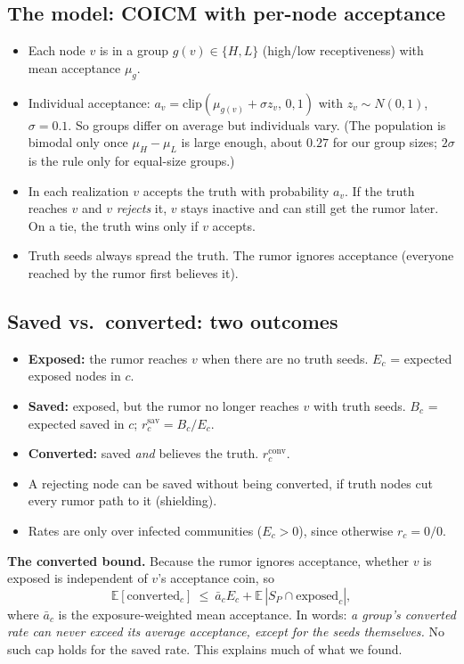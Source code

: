 \documentclass[11pt]{article}
\begin{document}
\subsection{The model: COICM with per-node acceptance}
\begin{itemize}
\item Each node $v$ is in a group $g(v)\in\{H,L\}$ (high/low receptiveness) with mean acceptance $\mu_g$.
\item Individual acceptance: $a_v=\mathrm{clip}(\mu_{g(v)}+\sigma z_v,\,0,1)$ with $z_v\sim N(0,1)$, $\sigma=0.1$. So groups differ on average but individuals vary. (The population is bimodal only once $\mu_H-\mu_L$ is large enough, about $0.27$ for our group sizes; $2\sigma$ is the rule only for equal-size groups.)
\item In each realization $v$ accepts the truth with probability $a_v$. If the truth reaches $v$ and $v$ \emph{rejects} it, $v$ stays inactive and can still get the rumor later. On a tie, the truth wins only if $v$ accepts.
\item Truth seeds always spread the truth. The rumor ignores acceptance (everyone reached by the rumor first believes it).
\end{itemize}

\subsection{Saved vs.\ converted: two outcomes}
\begin{itemize}
\item \textbf{Exposed:} the rumor reaches $v$ when there are no truth seeds. $E_c$ = expected exposed nodes in $c$.
\item \textbf{Saved:} exposed, but the rumor no longer reaches $v$ with truth seeds. $B_c$ = expected saved in $c$; $r_c^{\mathrm{sav}}=B_c/E_c$.
\item \textbf{Converted:} saved \emph{and} believes the truth. $r_c^{\mathrm{conv}}$.
\item A rejecting node can be saved without being converted, if truth nodes cut every rumor path to it (shielding).
\item Rates are only over infected communities ($E_c>0$), since otherwise $r_c=0/0$.
\end{itemize}

\textbf{The converted bound.} Because the rumor ignores acceptance, whether $v$ is exposed is independent of $v$'s acceptance coin, so
\[
\mathbb E[\text{converted}_c]\ \le\ \bar a_c E_c+\mathbb E\,|S_P\cap\text{exposed}_c|,
\]
where $\bar a_c$ is the exposure-weighted mean acceptance. In words: \emph{a group's converted rate can never exceed its average acceptance, except for the seeds themselves.} No such cap holds for the saved rate. This explains much of what we found.
\end{document}
